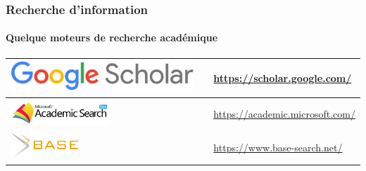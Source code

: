 \documentclass{beamer}
\begin{document}
\begin{frame}
\frametitle{Recherche d'information}
\framesubtitle{Quelque moteurs de recherche académique}

%	
%	

\def\arraystretch{0}
\begin{tabular}{L{.3\textwidth}{1cm}cp{.6\textwidth}}%
	
	\hline
	
	\includegraphics[height=.6cm]{..//img/Bweb02-ri-gmail/gscholar-logo.png} &
	&
	\url{https://scholar.google.com/} \\
	
	\hline
	
	\includegraphics[height=1cm]{..//img/Bweb02-ri-gmail/msacademic-logo.png} &
	& 
	\url{https://academic.microsoft.com/}  \\
	
	\hline
	
	\includegraphics[height=1cm]{..//img/Bweb02-ri-gmail/base-logo.png} &
	& 
	\url{https://www.base-search.net/} \\
	
	\hline
	

\end{tabular}
\end{frame}
\end{document}
